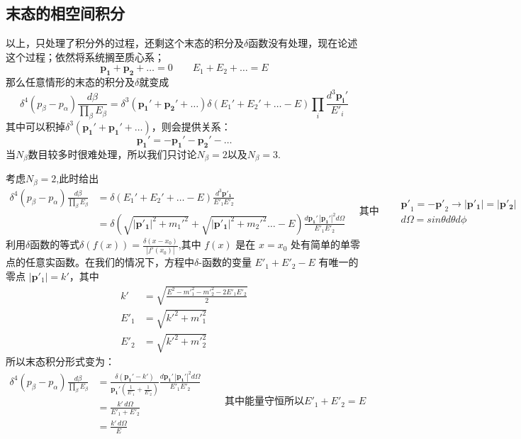 \subsection{末态的相空间积分}
以上，只处理了积分外的过程，还剩这个末态的积分及$\delta$函数没有处理，现在论述这个过程；依然将系统搁至质心系；
$$
    \boldsymbol{p_1}+\boldsymbol{p_2}+\dots=0\qquad E_1+E_2+\dots=E
$$
那么任意情形的末态的积分及$\delta$就变成
$$
    \delta^4(p_\beta-p_\alpha)\frac{d\beta}{\prod_{\beta}E_{\beta}}
    =
    \delta^3(\boldsymbol{p_1'}+\boldsymbol{p_2'}+\dots)\delta(E_1'+E_2'+\dots-E)\prod_{i} \frac{d^3\boldsymbol{p_i'}}{E'_i}
$$
其中可以积掉$\delta^3(\boldsymbol{p_1'}+\boldsymbol{p_1'}+\dots)$，则会提供关系：
$$
    \boldsymbol{p_1'}=-\boldsymbol{p_1'}-\boldsymbol{p_2'}-\dots
$$
当$N_{\beta}$数目较多时很难处理，所以我们只讨论$N_{\beta}=2$以及$N_{\beta}=3$.
\begin{center}
    \vspace{0.5cm}
   \color{black}\text{***}
   \vspace{0.5cm}
\end{center}
考虑$N_{\beta}=2$,此时给出
\[\begin{aligned}
    \delta^4(p_\beta-p_\alpha)\frac{d\beta}{\prod_{\beta}E_{\beta}}
    &=
    \delta(E_1'+E_2'+\dots-E) \frac{d^3\boldsymbol{p'_1}}{E'_1E'_2}
    \\&=\delta(\sqrt{|\boldsymbol{p'_1}|^2+m_1'^2}+\sqrt{|\boldsymbol{p'_1}|^2+m_2'^2}\dots-E) \frac{d\boldsymbol{p_1'}\,|\boldsymbol{p_1'}|^2 d\Omega}{E'_1E'_2}
\end{aligned}
\quad\text{其中}\quad\begin{aligned}
    &\boldsymbol{p'}_1=-\boldsymbol{p'}_2\to|\boldsymbol{p'_1}|=|\boldsymbol{p'_2}|\\&d\Omega=sin\theta d\theta d\phi
\end{aligned}\]
利用$\delta$函数的等式$\delta(f(x)) =\frac{\delta(x - x_0) }{|f'(x_0)|}$,其中 $f(x)$ 是在 $x=x_0$ 处有简单的单零点的任意实函数。在我们的情况下，方程中$\delta$-函数的变量 $E'_1 + E'_2 - E$ 有唯一的零点 $|\mathbf{p}'_1| = k'$，其中
\begin{align*}
k' &= \sqrt{\frac{E^2-m'^2_1-m'^2_2-2E'_1E'_2}{2}}  \\
E'_1 &= \sqrt{k'^2 + m'^2_1}  \\
E'_2 &= \sqrt{k'^2 + m'^2_2} 
\end{align*}
所以末态积分形式变为：
\begin{equation}
    \begin{aligned}
    \delta^4(p_\beta-p_\alpha)\frac{d\beta}{\prod_{\beta}E_{\beta}}
    &=\frac{\delta(\boldsymbol{p_1'}-k')}{\boldsymbol{p_1'}(\frac{1}{E'_1}+\frac{1}{E'_2})} \frac{d \boldsymbol{p_1'}\,|\boldsymbol{p_1'}|^2 d\Omega}{E'_1E'_2}
    \\&=\frac{k'\,d\Omega}{E'_1+E'_2}
    \\&=\frac{k'\,d\Omega}{E}
\end{aligned}\qquad\text{其中能量守恒所以}E'_1+E'_2=E
\end{equation}
